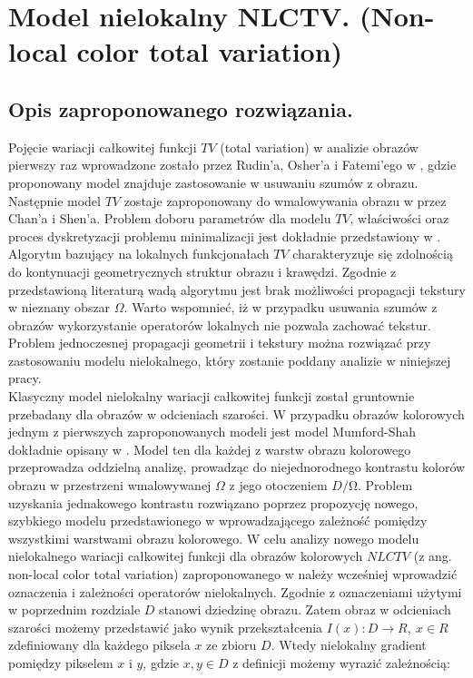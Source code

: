 \documentclass[a4paper,12pt,twoside,openany]{report}
\begin{document}
\section{Model nielokalny NLCTV. (Non-local color total variation)}
\subsection{Opis zaproponowanego rozwiązania.}
\label{sec:sNLCTV}
Pojęcie wariacji całkowitej funkcji $TV$ (total variation) w analizie obrazów pierwszy raz wprowadzone zostało przez Rudin'a, Osher'a i Fatemi’ego w \cite{rudin1992nonlinear}, gdzie proponowany model znajduje zastosowanie w usuwaniu szumów z obrazu. Następnie model $TV$ zostaje zaproponowany do wmalowywania obrazu w \cite{MathematicalModelsforNLTextureInpainting} przez Chan'a i Shen’a. Problem doboru parametrów dla modelu $TV$, właściwości oraz proces dyskretyzacji problemu minimalizacji jest dokładnie przedstawiony w \cite{getreuer2012total}. Algorytm bazujący na lokalnych funkcjonałach $TV$  charakteryzuje się zdolnością do kontynuacji geometrycznych struktur obrazu i krawędzi. Zgodnie z przedstawioną literaturą wadą algorytmu jest brak możliwości propagacji tekstury w nieznany obszar $\Omega$. Warto wspomnieć, iż w przypadku usuwania szumów z obrazów wykorzystanie operatorów lokalnych nie pozwala zachować tekstur. Problem jednoczesnej propagacji geometrii i tekstury można rozwiązać przy zastosowaniu modelu nielokalnego, który zostanie poddany analizie w niniejszej pracy. \\
Klasyczny model nielokalny wariacji całkowitej funkcji został gruntownie przebadany dla obrazów w odcieniach szarości. W przypadku obrazów kolorowych jednym z pierwszych zaproponowanych modeli jest model Mumford-Shah dokładnie opisany w \cite{jung2011nonlocal}. Model ten dla każdej z warstw obrazu kolorowego przeprowadza oddzielną analizę, prowadząc do niejednorodnego kontrastu kolorów obrazu w przestrzeni wmalowywanej $\Omega$ z jego otoczeniem $D/\mathrm{\Omega}$. Problem uzyskania jednakowego kontrastu rozwiązano poprzez propozycję nowego, szybkiego modelu przedstawionego w \cite{duan2015fast} wprowadzającego zależność pomiędzy wszystkimi warstwami obrazu kolorowego. W celu analizy nowego modelu nielokalnego wariacji całkowitej funkcji dla obrazów kolorowych $NLCTV$ (z ang. non-local color total variation) zaproponowanego w \cite{duan2015fast} należy wcześniej wprowadzić oznaczenia i zależności operatorów nielokalnych. 
Zgodnie z oznaczeniami użytymi w poprzednim rozdziale $D$ stanowi dziedzinę obrazu. Zatem obraz w odcieniach szarości możemy przedstawić jako wynik przekształcenia $I\left(x\right):D\longrightarrow R,\ x\in R$ zdefiniowany dla każdego piksela $x$ ze zbioru $D$. Wtedy nielokalny gradient pomiędzy pikselem $x$ i $y$, gdzie $x,y\in D$ z definicji możemy wyrazić zależnością:
\end{document}
